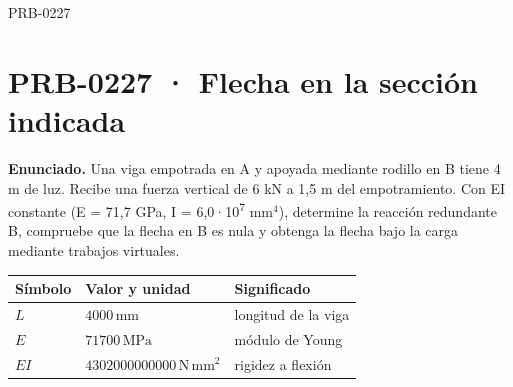 \begin{studiumworked}{PRB-0227}

\section{PRB-0227 · Flecha en la sección indicada}

\textbf{Enunciado.} Una viga empotrada en A y apoyada mediante rodillo en B tiene 4 m de luz. Recibe una fuerza vertical de 6 kN a 1,5 m del empotramiento. Con EI constante (E = 71,7 GPa, I = 6,0·10\textsuperscript{7} mm$^4$), determine la reacción redundante B, compruebe que la flecha en B es nula y obtenga la flecha bajo la carga mediante trabajos virtuales.

\par\medskip\noindent\begin{tabular}{@{}p{.18\linewidth}p{.26\linewidth}p{.48\linewidth}@{}}
\toprule Símbolo & Valor y unidad & Significado\\\midrule
$L$ & $4000\,\mathrm{mm}$ & longitud de la viga\\
$E$ & $71700\,\mathrm{MPa}$ & módulo de Young\\
$EI$ & $4302000000000\,\mathrm{N\,mm^2}$ & rigidez a flexión\\
\bottomrule\end{tabular}\par\medskip


\end{studiumworked}
